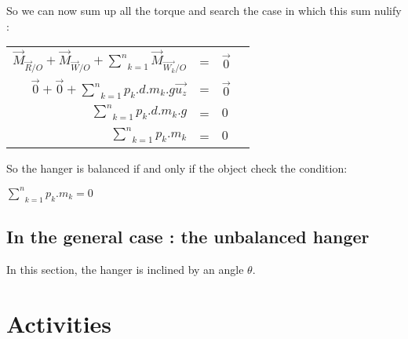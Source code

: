 \documentclass{report}
\begin{document}
So we can now sum up all the torque and search the case in which this sum nulify :
\begin{tabular}{rcll}
$\overrightarrow{M}_{\overrightarrow{R}/O} + \overrightarrow{M}_{\overrightarrow{W}/O} + \underset{k = 1}{\overset{n}{\sum}} \overrightarrow{M}_{\overrightarrow{W_k}/O}$ & = & $\overrightarrow{0}$ & \\
$\overrightarrow{0} + \overrightarrow{0} + \underset{k = 1}{\overset{n}{\sum}} p_k . d . m_k . g \overrightarrow{u_z}$ & = & $\overrightarrow{0}$ & \\
$\underset{k = 1}{\overset{n}{\sum}} p_k . d . m_k . g $ & = & $0$ & \\
$\underset{k = 1}{\overset{n}{\sum}} p_k . m_k $ & = & $0$ & \\
\end{tabular}

So the hanger is balanced if and only if the object check the condition: 
\begin{center}
$\underset{k = 1}{\overset{n}{\sum}} p_k . m_k = 0$
\end{center}


\section{In the general case : the unbalanced hanger}

In this section, the hanger is inclined by an angle $\theta$.




\chapter{Activities}
\end{document}
